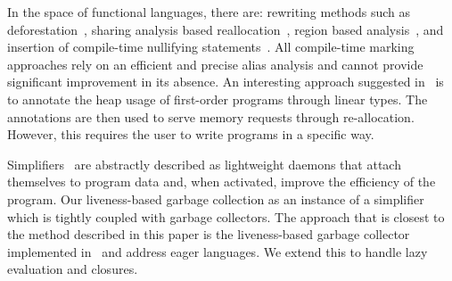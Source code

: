 \documentclass[9pt]{sigplanconf}
\begin{document}
In the space of functional  languages, there are: rewriting methods such as
deforestation~\cite{wadler88deforest,gill93ashort,chitil99deforest},
sharing  analysis   based  reallocation~\cite{jones89compile},  region
based   analysis~\cite{tofte98region},   and    insertion   of
compile-time                                                nullifying
statements~\cite{inoue88analysis,lee05static,Hamilton}.            All
compile-time marking approaches rely on an efficient and precise alias
analysis and  cannot provide  significant improvement in  its absence.
An interesting approach suggested  in~\cite{HofmannJ03} is to annotate
the  heap usage  of first-order  programs through  linear types.   The
annotations   are  then   used  to   serve  memory   requests  through
re-allocation.  However, this requires the user to write programs in a
specific way.


Simplifiers~\cite{ONeill} are abstractly described as lightweight
daemons that attach themselves to program data and, when activated, improve
the efficiency of the program. Our liveness-based garbage collection
as an instance of a  simplifier which is tightly coupled with garbage collectors.  The
approach that is closest to the  method described in this paper is the
liveness-based garbage collector implemented
in~\cite{karkare07liveness,asati14lgc} and address eager languages. We
extend this to handle lazy evaluation and closures.
 



\end{document}
